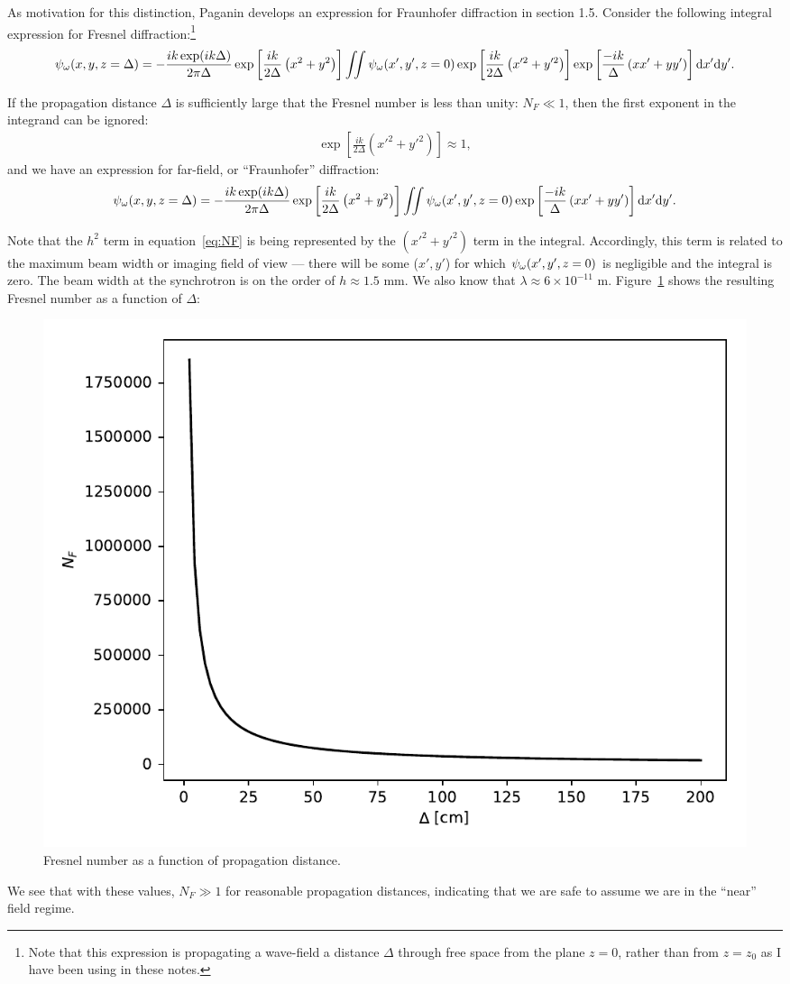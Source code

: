 \documentclass{article}
\begin{document}
As motivation for this distinction, Paganin develops an expression for
Fraunhofer diffraction in section 1.5. Consider the following integral
expression for Fresnel diffraction:\footnote{Note that this expression is
  propagating a wave-field a distance $\Delta$ through free space from the plane
  $z=0$, rather than from $z=z_0$ as I have been using in these notes.}
\begin{align}
  \psi_{\omega}(x,y,z=\Delta) = -\frac{ik\exp(ik\Delta)}{2\pi\Delta}\exp\left[\frac{ik}{2\Delta}\left(x^2 + y^2\right)\right]\iint\psi_{\omega}(x',y',z=0)\exp\left[\frac{ik}{2\Delta}\left(x'^2 + y'^2\right)\right]\exp\left[\frac{-ik}{\Delta}\left(xx' + yy'\right)\right]\mathrm{d}x'\mathrm{d}y'.
\end{align}

If the propagation distance $\Delta$ is sufficiently large that the Fresnel
number is less than unity: $N_F \ll 1$, then the first exponent in the
integrand can be ignored:
\begin{align}
  \exp\left[\frac{ik}{2\Delta}\left(x'^2 + y'^2\right)\right] \approx 1,
\end{align}
and we have an expression for far-field, or ``Fraunhofer'' diffraction:
\begin{align}
  \psi_{\omega}(x,y,z=\Delta) = -\frac{ik\exp(ik\Delta)}{2\pi\Delta}\exp\left[\frac{ik}{2\Delta}\left(x^2 + y^2\right)\right]\iint\psi_{\omega}(x',y',z=0)\exp\left[\frac{-ik}{\Delta}\left(xx' + yy'\right)\right]\mathrm{d}x'\mathrm{d}y'.
  \label{eq:fraunhofer}
\end{align}

Note that the $h^2$ term in equation~\ref{eq:NF} is being represented by the
$(x'^2 + y'^2)$ term in the integral. Accordingly, this term is related to the
maximum beam width or imaging field of view --- there will be some ($x', y'$)
for which $\psi_{\omega}(x',y',z=0)$ is negligible and the integral is zero. The beam
width at the synchrotron is on the order of $h\approx 1.5$ mm. We also know that
$\lambda \approx 6\times 10^{-11}$ m. Figure~\ref{fig:fresnelnum} shows the
resulting Fresnel number as a function of $\Delta$:
\begin{figure}[h]
  \centering
  \includegraphics[width=0.6\linewidth]{figs/fresnelnum}
  \captionsetup{width=0.6\linewidth}
  \caption{Fresnel number as a function of propagation distance.}
  \label{fig:fresnelnum}
\end{figure}
We see that with these values, $N_F \gg 1$ for reasonable propagation distances,
indicating that we are safe to assume we are in the ``near'' field regime.
\end{document}

